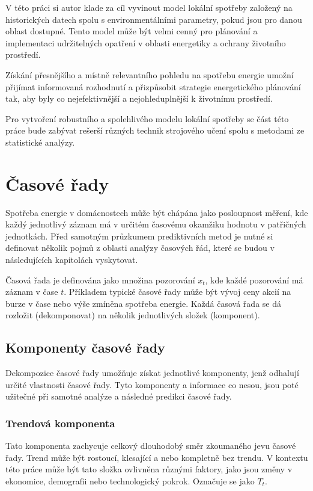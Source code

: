 \documentclass[FM,BP,fonts]{tulthesis}
\begin{document}
V této práci si autor klade za cíl vyvinout model lokální spotřeby založený na historických datech spolu s environmentálními parametry, pokud jsou pro danou
oblast dostupné. Tento model může být velmi cenný pro plánování a implementaci udržitelných opatření v oblasti energetiky a ochrany životního prostředí. 

Získání přesnějšího a místně relevantního pohledu na spotřebu energie umožní přijímat informovaná rozhodnutí a přizpůsobit strategie energetického plánování tak, aby byly co nejefektivnější a nejohleduplnější k životnímu prostředí.

Pro vytvoření robustního a spolehlivého modelu lokální spotřeby se část této práce bude zabývat rešerší různých technik strojového učení spolu s metodami
ze statistické analýzy.


\chapter{Časové řady}
Spotřeba energie v domácnostech může být chápána jako posloupnost měření, kde každý jednotlivý záznam má v určitém časovému okamžiku hodnotu v patřičných jednotkách. Před samotným průzkumem prediktivních metod je nutné si definovat několik pojmů z oblasti analýzy časových řád, které se budou v následujících kapitolách vyskytovat.

Časová řada je definována jako množina pozorování $x_t$, kde každé pozorování má záznam v čase $t$. \cite{Brockwell2016-qt} Příkladem typické časové řady může být vývoj ceny akcií na burze v čase nebo výše zmíněna spotřeba energie. Každá časová řada se dá rozložit (dekomponovat) na několik jednotlivých složek (komponent). 


\section{Komponenty časové řady}
Dekompozice časové řady umožňuje získat jednotlivé komponenty, jenž odhalují určité vlastnosti časové řady. Tyto komponenty a informace co nesou, jsou poté užitečné při samotné analýze a následné predikci časové řady.

\subsection{Trendová komponenta}
Tato komponenta zachycuje celkový dlouhodobý směr zkoumaného jevu časové řady. Trend může být rostoucí, klesající a nebo kompletně bez trendu. V kontextu této práce může být tato složka ovlivněna různými faktory, jako jsou změny v ekonomice, demografii nebo technologický pokrok. Označuje se jako $T_t$.
\end{document}
